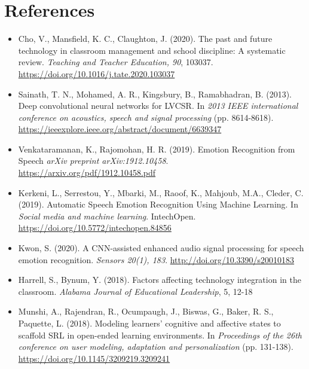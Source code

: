\documentclass[12pt]{article}
\begin{document}
\section{References}

\begin{itemize}
\item Cho, V., Mansfield, K. C., Claughton, J. (2020). The past and future technology in classroom management and school discipline: A systematic review. \textit{Teaching and Teacher Education, 90}, 103037. \href{https://doi.org/10.1016/j.tate.2020.103037}{https://doi.org/10.1016/j.tate.2020.103037}

\item Sainath, T. N., Mohamed, A. R., Kingsbury, B., Ramabhadran, B. (2013). Deep convolutional neural networks for LVCSR. In \textit{2013 IEEE international conference on acoustics, speech and signal processing} (pp. 8614-8618). \tab \href{https://ieeexplore.ieee.org/abstract/document/6639347}{https://ieeexplore.ieee.org/abstract/document/6639347}

\item Venkataramanan, K., Rajomohan, H. R. (2019). Emotion Recognition from Speech \textit{arXiv preprint arXiv:1912.10458}. \href{https://arxiv.org/pdf/1912.10458.pdf}{https://arxiv.org/pdf/1912.10458.pdf}

\item Kerkeni, L., Serrestou, Y., Mbarki, M., Raoof, K., Mahjoub, M.A., Cleder, C. (2019). Automatic Speech Emotion Recognition Using Machine Learning. In \textit{Social media and machine learning}. IntechOpen. \href{https://doi.org/10.5772/intechopen.84856}{https://doi.org/10.5772/intechopen.84856}

\item Kwon, S. (2020). A CNN-assisted enhanced audio signal processing for speech emotion recognition. \textit{Sensors 20(1), 183}. \href{http://doi.org/10.3390/s20010183}{http://doi.org/10.3390/s20010183}

\item Harrell, S., Bynum, Y. (2018). Factors affecting technology integration in the classroom. \textit{Alabama Journal of Educational Leadership}, 5, 12-18

\item Munshi, A., Rajendran, R., Ocumpaugh, J., Biswas, G., Baker, R. S., Paquette, L. (2018). Modeling learners' cognitive and affective states to scaffold SRL in open-ended learning environments. In \textit{Proceedings of the 26th conference on user modeling, adaptation and personalization} (pp. 131-138). \tab \href{https://doi.org/10.1145/3209219.3209241}{https://doi.org/10.1145/3209219.3209241}
\end{itemize}

\newpage
\end{document}
